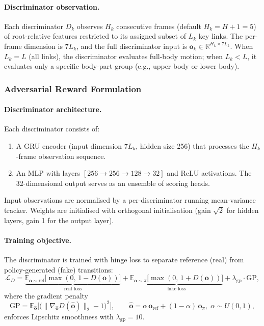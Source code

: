 \paragraph{Discriminator observation.}
Each discriminator $D_k$ observes $H_k$ consecutive frames (default $H_k = H{+}1 = 5$) of root-relative features restricted to its assigned subset of $L_k$ key links. The per-frame dimension is $7L_k$, and the full discriminator input is $\mathbf{o}_k \in \mathbb{R}^{H_k \times 7L_k}$. When $L_k = L$ (all links), the discriminator evaluates full-body motion; when $L_k < L$, it evaluates only a specific body-part group (e.g., upper body or lower body).


\subsubsection{Adversarial Reward Formulation}
\label{sec:adversarial}

\paragraph{Discriminator architecture.}
Each discriminator consists of:
\begin{enumerate}
    \item A GRU encoder (input dimension $7L_k$, hidden size 256) that processes the $H_k$-frame observation sequence.
    \item An MLP with layers $[256 \to 256 \to 128 \to 32]$ and ReLU activations. The 32-dimensional output serves as an ensemble of scoring heads.
\end{enumerate}
Input observations are normalised by a per-discriminator running mean-variance tracker. Weights are initialised with orthogonal initialisation (gain $\sqrt{2}$ for hidden layers, gain 1 for the output layer).

\paragraph{Training objective.}
The discriminator is trained with hinge loss to separate reference (real) from policy-generated (fake) transitions:
\begin{equation}
    \mathcal{L}_D = \underbrace{\mathbb{E}_{\mathbf{o} \sim \text{ref}}\bigl[\max(0,\, 1 - D(\mathbf{o}))\bigr]}_{\text{real loss}} + \underbrace{\mathbb{E}_{\mathbf{o} \sim \pi}\bigl[\max(0,\, 1 + D(\mathbf{o}))\bigr]}_{\text{fake loss}} + \lambda_{\mathrm{gp}} \cdot \mathrm{GP},
    \label{eq:disc_loss}
\end{equation}
where the gradient penalty~\cite{wgangp2017}
\[
    \mathrm{GP} = \mathbb{E}_{\hat{\mathbf{o}}}\bigl[\bigl(\|\nabla_{\hat{\mathbf{o}}} D(\hat{\mathbf{o}})\|_2 - 1\bigr)^2\bigr], \qquad \hat{\mathbf{o}} = \alpha\,\mathbf{o}_{\mathrm{ref}} + (1{-}\alpha)\,\mathbf{o}_{\pi},\; \alpha \sim U(0,1),
\]
enforces Lipschitz smoothness with $\lambda_{\mathrm{gp}} = 10$.

